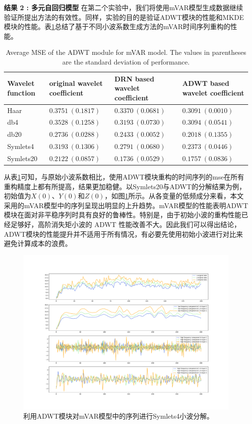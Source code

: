 \textbf{结果 2 : 多元自回归模型}
在第二个实验中，我们将使用mVAR模型生成数据继续验证所提出方法的有效性。同样，实验的目的是验证ADWT模块的性能和MKDE模块的性能。表\ref{table2}总结了基于不同小波系数生成方法的mVAR时间序列重构的性能。
\begin{table}[!ht]
\fontsize{8}{14}\selectfont
\centering
\caption{Average MSE of the ADWT module for mVAR model. The values in parentheses are the standard deviation of performance.}
\begin{tabular}{llll}
 \hline
  Wavelet function & original wavelet coefficient &  DRN based wavelet coefficient &ADWT based wavelet coefficient\\
  \hline
  Haar & $0.3751\ (0.1817)$ & $0.3370\ (0.0681)$ & $0.3091\ (0.0010)$\\
  \hline
  db4 & $0.3528\ (0.1258)$ & $0.3193\ (0.0730)$& $0.3094\ (0.0541)$\\
  \hline
  db20 & $0.2736\ (0.0288)$ & $0.2433\ (0.0052)$& $0.2018\ (0.1355)$\\
  \hline
  Symlets4  & $0.3193\ (0.1306)$& $0.2791\ (0.0680)$& $0.2373\ (0.0446)$\\
  \hline
  Symlets20  & $0.2122\ (0.0857)$ & $0.1736\ (0.0529)$& $0.1757\ (0.0836)$\\
  \hline
\end{tabular}
\label{table2}
\end{table}

从表\ref{table2}可知，与原始小波系数相比，使用ADWT模块重构的时间序列的mse在所有重构精度上都有所提高，结果更加稳健。以Symlets20与ADWT的分解结果为例，初始值为$X(0)$、$Y(0)$和$Z(0)$，如图\ref{figure6}所示。从各变量的低频成分来看，本文采用的mVAR模型中的序列呈现出明显的上升趋势。mVAR模型的性能表明ADWT模块在面对非平稳序列时具有良好的鲁棒性。特别是，由于初始小波的重构性能已经足够好，高阶消失矩小波的 ADWT 性能改善不大。因此我们可以得出结论，ADWT模块的性能提升并不适用于所有情况，有必要先使用初始小波进行对比来避免计算成本的浪费。
\begin{figure}[!ht]
\begin{center}
\includegraphics[width=1\textwidth]{./ch3/fig3_6.pdf}
\caption{利用ADWT模块对mVAR模型中的序列进行Symlets4小波分解。} \label{figure6}
\end{center}
\end{figure}

